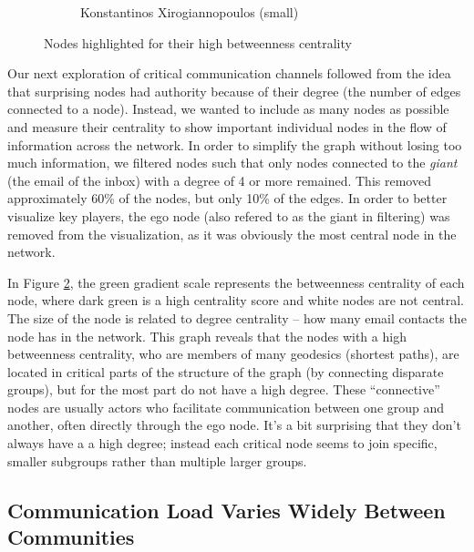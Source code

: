 \documentclass[11pt,letterpaper]{article}
\begin{document}
\begin{figure}[h]
\begin{subfigure}{0.49\textwidth}
		\caption{\textsf{Konstantinos Xirogiannopoulos (small)}}
        \label{fig:kostas_centrality}
	\end{subfigure}
    \caption{\textsf{Nodes highlighted for their high betweenness centrality}}
    \label{fig:centrality}
\end{figure}

Our next exploration of critical communication channels followed from the idea that surprising nodes had authority because of their degree (the number of edges connected to a node). Instead, we wanted to include as many nodes as possible and measure their centrality to show important individual nodes in the flow of information across the network. In order to simplify the graph without losing too much information, we filtered nodes such that only nodes connected to the \textit{giant} (the email of the inbox) with a degree of 4 or more remained. This removed approximately 60\% of the nodes, but only 10\% of the edges. In order to better visualize key players, the ego node (also refered to as the giant in filtering) was removed from the visualization, as it was obviously the most central node in the network.

In Figure \ref{fig:centrality}, the green gradient scale represents the betweenness centrality of each node, where dark green is a high centrality score and white nodes are not central. The size of the node is related to degree centrality -- how many email contacts the node has in the network. This graph reveals that the nodes with a high betweenness centrality, who are members of many geodesics (shortest paths), are located in critical parts of the structure of the graph (by connecting disparate groups), but for the most part do not have a high degree. These ``connective'' nodes are usually actors who facilitate communication between one group and another, often directly through the ego node. It's a bit surprising that they don't always have a a high degree; instead each critical node seems to join specific, smaller subgroups rather than multiple larger groups.

\subsection*{Communication Load Varies Widely Between Communities}
\end{document}
